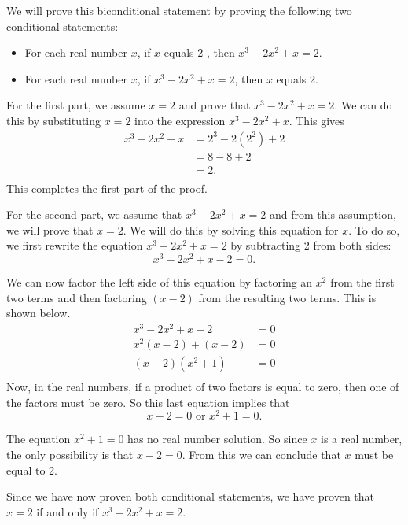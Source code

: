 \begin{myproof}
We will prove this biconditional statement by proving the following two conditional statements:

\begin{itemize}
  \item For each real number $x$, if  $x$   equals  2 , then  $x^3  - 2x^2  + x = 2$.
  \item For each real number $x$, if   $x^3  - 2x^2  + x = 2$, then  $x$  equals 2.
\end{itemize}

For the first part, we assume  $x = 2$ and prove that $x^3  - 2x^2  + x = 2$.  We can do this by substituting  $x = 2$ into the expression  $x^3  - 2x^2  + x$.  This gives
\[
\begin{aligned}
  x^3  - 2x^2  + x &= 2^3  - 2\left( {2^2 } \right) + 2 \\ 
   &= 8 - 8 + 2 \\ 
   &= 2. \\ 
\end{aligned}
\]
This completes the first part of the proof.  

\newpar
For the second part, we assume that  $x^3  - 2x^2  + x = 2$ and from this assumption, we will prove that  $x = 2$.  We will do this by solving this equation for  $x$.  To do so, we first rewrite the equation  $x^3  - 2x^2  + x = 2$ by subtracting 2 from both sides:
\[
x^3  - 2x^2  + x - 2 = 0.
\]

We can now factor the left side of this equation by factoring an  $x^2$  from the first two terms and then factoring  $\left( {x - 2} \right)$ from the resulting two terms.  This is shown below.
\[
\begin{aligned}
  x^3  - 2x^2  + x - 2 &= 0 \\ 
  x^2 \left( {x - 2} \right) + \left( {x - 2} \right) &= 0 \\ 
  \left( {x - 2} \right)\left( {x^2  + 1} \right) &= 0 \\ 
\end{aligned}
\]
Now, in the real numbers, if a product of two factors is equal to zero, then one of the factors must be zero.  So this last equation implies that
\[
x - 2 = 0\text{  or  }x^2  + 1 = 0.
\]

The equation  $x^2  + 1 = 0$ has no real number solution.  So since  $x$  is a real number, the only possibility is that  $x - 2 = 0$.  From this we can conclude that  $x$  must be equal to  2.

Since we have now proven both conditional statements, we have proven that  $x = 2$  if and only if   $x^3  - 2x^2  + x = 2$.
%
\end{myproof}
%
\hbreak

\endinput
